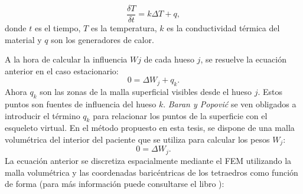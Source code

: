




\begin{equation}
\label{diffusion}
 \frac{\delta T}{ \delta t} = k \Delta T + q,
\end{equation}
%
donde $t$ es el tiempo, $T$ es la temperatura, $k$ es la conductividad térmica del material
y $q$ son los generadores de calor.

A la hora de calcular la influencia $Wj$ de cada hueso $j$, se resuelve la ecuación anterior en el caso estacionario: 
\begin{equation}
\label{diffusion1}
 0 =  \Delta W_j +  q_{k}.
\end{equation}
Ahora $q_{k}$ son las zonas de la malla superficial visibles desde el hueso $j$. Estos puntos son fuentes de influencia del hueso $k$. \emph{Baran y Popovi\'{c}} se ven obligados a introducir el término $q_{k}$ para relacionar los puntos de la superficie con el esqueleto virtual. 
En el método propuesto en esta tesis, se dispone de una malla volumétrica del interior del paciente que se utiliza para calcular los pesos $W_j$:  
\begin{equation}
\label{diffusion2}
 0 =  \Delta W_j.
\end{equation}
La ecuación anterior se discretiza espacialmente mediante el \ac{FEM} utilizando la malla volumétrica y las coordenadas baricéntricas de los tetraedros como función de forma (para más información puede consultarse el libro \cite{Lewis2004}):  

